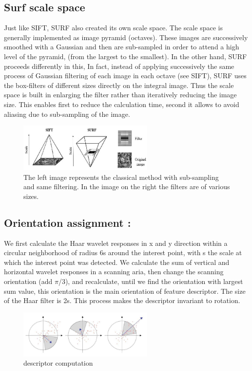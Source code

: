 \subsection{Surf scale space }
Just like SIFT, SURF also created its own scale space.
The scale space is generally implemented as image pyramid (octaves). These images are successively smoothed with a Gaussian and then are sub-sampled in order to attend a high level of the pyramid, (from the largest to the smallest). In  the other hand, SURF proceeds differently in this, In fact, instead of applying successively the same process of Gaussian filtering of each image in  each octave (see SIFT), SURF uses the box-filters of different sizes directly on the integral image. Thus the scale space is built in enlarging the filter rather than iteratively reducing the image size. This enables first to reduce the calculation time, second it allows to avoid aliasing due to sub-sampling of the image.
\begin{figure}[H]
\centering
\includegraphics[width=0.6\textwidth]{img/surf2.png}
\caption {The left image represents the classical method with sub-sampling and same filtering. In the image on the right the filters are of various sizes.}
\label{fig:surf2}
\end{figure}


\subsection{Orientation assignment : }

We first calculate the Haar wavelet responses in x and y direction within a circular neighborhood of radius 6s around the interest point, with s the scale at which the interest point was detected. We calculate the sum of vertical and horizontal wavelet responses in a scanning aria, then change the scanning orientation (add $\pi$/3), and recalculate, until we find the orientation with largest sum value, this orientation is the main orientation of feature descriptor.   The size of the Haar filter is 2s. This process makes the descriptor invariant to rotation.

\begin{figure}[H]
\centering
\includegraphics[width=0.6\textwidth]{img/surf3.jpg}
\caption{descriptor computation }
\label{fig:surf3}
\end{figure}

